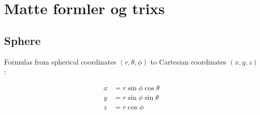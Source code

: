 \section{Matte formler og trixs}

\subsection{Sphere}
Formulas from spherical coordinates \((r, \theta, \phi)\) to Cartesian coordinates \((x, y, z)\):

\begin{align*}
x &= r \sin\phi \cos\theta \\
y &= r \sin\phi \sin\theta \\
z &= r \cos\phi
\end{align*}
